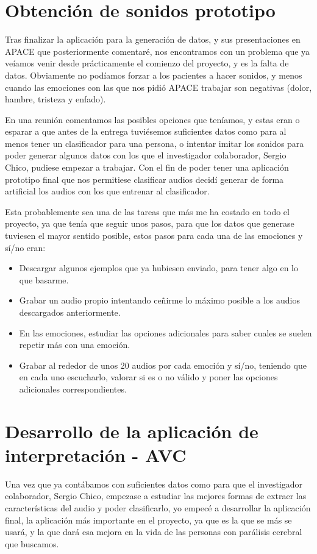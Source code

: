 \section{Obtención de sonidos prototipo}
Tras finalizar la aplicación para la generación de datos, y sus presentaciones en APACE que posteriormente comentaré, nos encontramos con un problema que ya veíamos venir desde prácticamente el comienzo del proyecto, y es la falta de datos. Obviamente no podíamos forzar a los pacientes a hacer sonidos, y menos cuando las emociones con las que nos pidió APACE trabajar son negativas (dolor, hambre, tristeza y enfado).

En una reunión comentamos las posibles opciones que teníamos, y estas eran o esparar a que antes de la entrega tuviésemos suficientes datos como para al menos tener un clasificador para una persona, o intentar imitar los sonidos para poder generar algunos datos con los que el investigador colaborador, Sergio Chico, pudiese empezar a trabajar. Con el fin de poder tener una aplicación prototipo final que nos permitiese clasificar audios decidí generar de forma artificial los audios con los que entrenar al clasificador.

Esta probablemente sea una de las tareas que más me ha costado en todo el proyecto, ya que tenía que seguir unos pasos, para que los datos que generase tuviesen el mayor sentido posible, estos pasos para cada una de las emociones y sí/no eran:
\begin{itemize}
	\item Descargar algunos ejemplos que ya hubiesen enviado, para tener algo en lo que basarme.
	\item Grabar un audio propio intentando ceñirme lo máximo posible a los audios descargados anteriormente.
	\item En las emociones, estudiar las opciones adicionales para saber cuales se suelen repetir más con una emoción.
	\item Grabar al rededor de unos 20 audios por cada emoción y sí/no, teniendo que en cada uno escucharlo, valorar si es o no válido y poner las opciones adicionales correspondientes.
\end{itemize}
\section{Desarrollo de la aplicación de interpretación - AVC}
Una vez que ya contábamos con suficientes datos como para que el investigador colaborador, Sergio Chico, empezase a estudiar las mejores formas de extraer las características del audio y poder clasificarlo, yo empecé a desarrollar la aplicación final, la aplicación más importante en el proyecto, ya que es la que se más se usará, y la que dará esa mejora en la vida de las personas con parálisis cerebral que buscamos.

